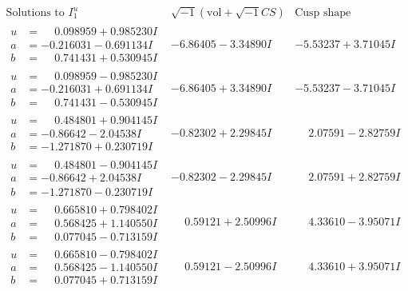 \documentclass[1p]{elsarticle_modified}
\theoremstyle{definition}
\newcommand{\I}{\sqrt{-1}}
\begin{document}
$$\begin{array}{c|c|c}  
\text{Solutions to }I^u_{1}& \I (\text{vol} + \sqrt{-1}CS) & \text{Cusp shape}\\
 \hline 
\begin{aligned}
u &= \phantom{-}0.098959 + 0.985230 I \\
a &= -0.216031 - 0.691134 I \\
b &= \phantom{-}0.741431 + 0.530945 I\end{aligned}
 & -6.86405 - 3.34890 I & -5.53237 + 3.71045 I \\ \hline\begin{aligned}
u &= \phantom{-}0.098959 - 0.985230 I \\
a &= -0.216031 + 0.691134 I \\
b &= \phantom{-}0.741431 - 0.530945 I\end{aligned}
 & -6.86405 + 3.34890 I & -5.53237 - 3.71045 I \\ \hline\begin{aligned}
u &= \phantom{-}0.484801 + 0.904145 I \\
a &= -0.86642 - 2.04538 I \\
b &= -1.271870 + 0.230719 I\end{aligned}
 & -0.82302 + 2.29845 I & \phantom{-}2.07591 - 2.82759 I \\ \hline\begin{aligned}
u &= \phantom{-}0.484801 - 0.904145 I \\
a &= -0.86642 + 2.04538 I \\
b &= -1.271870 - 0.230719 I\end{aligned}
 & -0.82302 - 2.29845 I & \phantom{-}2.07591 + 2.82759 I \\ \hline\begin{aligned}
u &= \phantom{-}0.665810 + 0.798402 I \\
a &= \phantom{-}0.568425 + 1.140550 I \\
b &= \phantom{-}0.077045 - 0.713159 I\end{aligned}
 & \phantom{-}0.59121 + 2.50996 I & \phantom{-}4.33610 - 3.95071 I \\ \hline\begin{aligned}
u &= \phantom{-}0.665810 - 0.798402 I \\
a &= \phantom{-}0.568425 - 1.140550 I \\
b &= \phantom{-}0.077045 + 0.713159 I\end{aligned}
 & \phantom{-}0.59121 - 2.50996 I & \phantom{-}4.33610 + 3.95071 I \\ \hline\begin{aligned}

\end{aligned}
\end{array}$$
\end{document}
